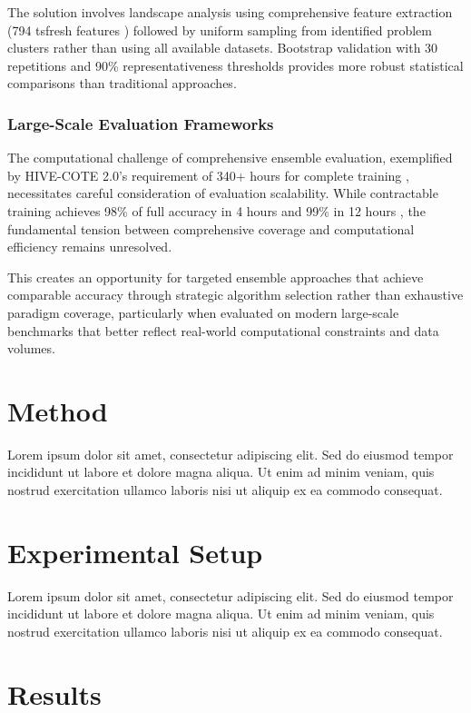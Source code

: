\documentclass[pdflatex,sn-basic]{sn-jnl}           %
\theoremstyle{thmstyleone}%
\theoremstyle{thmstyletwo}%
\theoremstyle{thmstylethree}%
\begin{document}
The solution involves landscape analysis using comprehensive feature extraction (794 tsfresh features \citep[p.~3]{less-is-more}) followed by uniform sampling from identified problem clusters rather than using all available datasets. Bootstrap validation with 30 repetitions and 90\% representativeness thresholds \citep[p.~5-6]{less-is-more} provides more robust statistical comparisons than traditional approaches.

\subsubsection{Large-Scale Evaluation Frameworks}

The computational challenge of comprehensive ensemble evaluation, exemplified by HIVE-COTE 2.0's requirement of 340+ hours for complete training \citep[Table~4, p.~17]{hive-cote-2}, necessitates careful consideration of evaluation scalability. While contractable training achieves 98\% of full accuracy in 4 hours and 99\% in 12 hours \citep[p.~27]{hive-cote-2}, the fundamental tension between comprehensive coverage and computational efficiency remains unresolved.

This creates an opportunity for targeted ensemble approaches that achieve comparable accuracy through strategic algorithm selection rather than exhaustive paradigm coverage, particularly when evaluated on modern large-scale benchmarks that better reflect real-world computational constraints and data volumes.

\section{Method}\label{sec3}

Lorem ipsum dolor sit amet, consectetur adipiscing elit. Sed do eiusmod tempor incididunt ut labore et dolore magna aliqua. Ut enim ad minim veniam, quis nostrud exercitation ullamco laboris nisi ut aliquip ex ea commodo consequat.

\section{Experimental Setup}\label{sec4}

Lorem ipsum dolor sit amet, consectetur adipiscing elit. Sed do eiusmod tempor incididunt ut labore et dolore magna aliqua. Ut enim ad minim veniam, quis nostrud exercitation ullamco laboris nisi ut aliquip ex ea commodo consequat.

\section{Results}\label{sec5}
\end{document}
